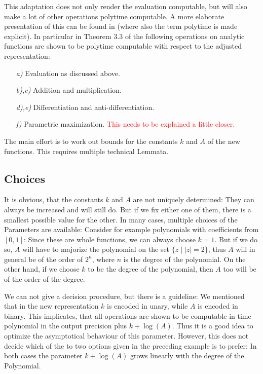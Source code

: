 \documentclass{article}
\newcommand{\temp}[1]{\textcolor{red}{#1}}
\begin{document}
This adaptation does not only render the evaluation computable, but will also make a lot of other operations polytime computable. A more elaborate presentation of this can be found in \cite{gevrey} (where also the term polytime is made explicit). In particular in Theorem 3.3 of \cite{gevrey} the following operations on analytic functions are shown to be polytime computable with respect to the adjusted representation:
\begin{enumerate}
\item[\itshape{a)}] Evaluation as discussed above.
\item[\itshape{b)},\itshape{c)}] Addition and multiplication.
\item[\itshape{d),e)}] Differentiation and anti-differentiation.
\item[\itshape{f)}] Parametric maximization. \temp{This needs to be explained a little closer.}
\end{enumerate}
The main effort is to work out bounds for the constants $k$ and $A$ of the new functions. This requires multiple technical Lemmata.

\subsection{Choices}

It is obvious, that the constants $k$ and $A$ are not uniquely determined: They can always be increased and will still do. But if we fix either one of them, there is a smallest possible value for the other. In many cases, multiple choices of the Parameters are available: Consider for example polynomials with coefficients from $[0,1]$: Since these are whole functions, we can always choose $k=1$. But if we do so, $A$ will have to majorize the polynomial on the set $\{z\mid |z| =2\}$, thus $A$ will in general be of the order of $2^n$, where $n$ is the degree of the polynomial. On the other hand, if we choose $k$ to be the degree of the polynomial, then $A$ too will be of the order of the degree.

We can not give a decision procedure, but there is a guideline: We mentioned that in the new representation $k$ is encoded in unary, while $A$ is encoded in binary. This implicates, that all operations are shown to be computable in time polynomial in the output precision plus $k + \log(A)$. Thus it is a good idea to optimize the asymptotical behaviour of this parameter. However, this does not decide which of the to two options given in the preceding example is to prefer: In both cases the parameter $k+\log(A)$ grows linearly with the degree of the Polynomial.
\end{document}
